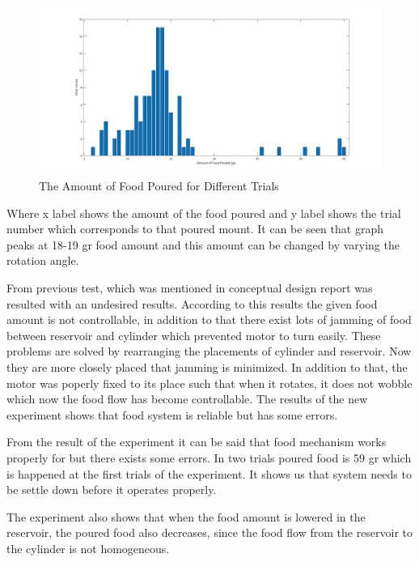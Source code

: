 \begin{figure}[ht]
     \centering
     \includegraphics[width=\linewidth]{content/060_mechanical_design/FoodPoured.png}
     \caption{The Amount of Food Poured for Different Trials}
     \label{fig:FoodPoured}
\end{figure}
Where x label shows the amount of the food poured and y label shows the trial number which corresponds to that poured mount. It can be seen that graph peaks at 18-19 gr food amount and this amount can be changed by varying the rotation angle.

From previous test, which was mentioned in conceptual design report was resulted with an undesired results. According to this results the given food amount is not controllable, in addition to that there exist lots of jamming of food between reservoir and cylinder which prevented motor to turn easily. These problems are solved by rearranging the placements of cylinder and reservoir. Now they are more closely placed that jamming is minimized. In addition to that, the motor was poperly fixed to its place such that when it rotates, it does not wobble which now the food flow has become controllable. The results of the new experiment shows that food system is reliable but has some errors.

From the result of the experiment it can be said that food mechanism works properly for but there exists some errors. In two trials poured food is 59 gr which is happened at the first trials of the experiment. It shows us that system needs to be settle down before it operates properly. 

The experiment also shows that when the food amount is lowered in the reservoir, the poured food also decreases, since the food flow from the reservoir to the cylinder is not homogeneous.


